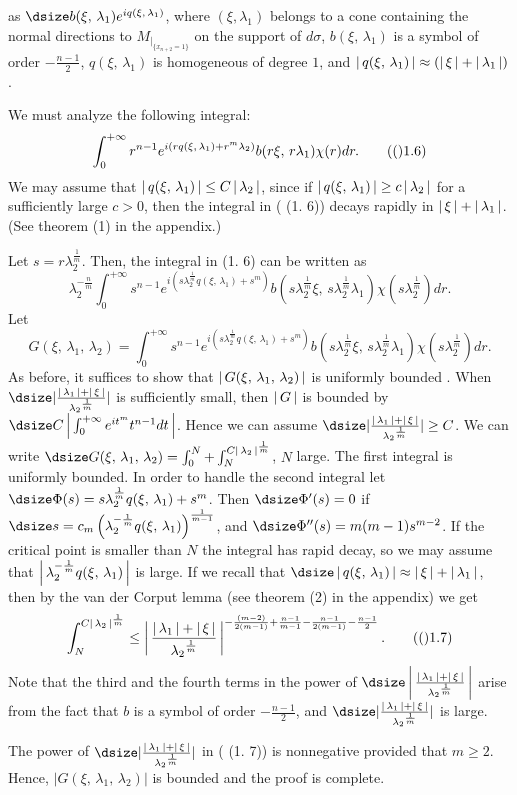 as 
$\dsize  b(\xi,\,\lambda_1)e^{iq(\xi,\,\lambda_1)}$, 
where  $(\xi,\lambda_1) $ belongs to a cone  containing 
the normal directions to $M_{\vert_{\{x_{n+2}=1\}}}$ on the support of 
$d\sigma$, $b(\xi,\,\lambda_1) $
is a symbol of order 
$-\frac{n-1}{2}$, $q(\xi,\,\lambda_1)$ is homogeneous of degree $1$, and 
$\left\vert\,{q(\xi,\,\lambda_1)}\,\right\vert\approx(\left\vert\,{\xi}\,\right\vert+\left\vert\,{\lambda_1}\,\right\vert)$.
\par
We must analyze the following integral:
$$ 
 \int_{0}^{+\infty}r^{n-1}
e^{i( rq(\xi,\,\lambda_1)+r^m\lambda_2)}b(r\xi, \,r\lambda_1)\chi(r)dr .
\tag (1. 6)
$$
We may assume that $\left\vert\,{q(\xi,\,\lambda_1) }\,\right\vert \leq C\left\vert\,{\lambda_2}\,\right\vert$, since if
$\left\vert\,{q(\xi,\,\lambda_1) }\,\right\vert \ge c\left\vert\,{\lambda_2}\,\right\vert$ for a sufficiently large 
$c >0$, then the integral in ( (1. 6)) decays rapidly in 
$\left\vert\,{\xi}\,\right\vert +\left\vert\,{\lambda_1}\,\right\vert $. (See theorem (1) in the appendix.)
\par
Let $s=r\lambda_2^{\frac{1}{m}} $. Then,  the integral in
 (1. 6) can be written as
$$
\lambda_2^{-\frac{n}{m}}\int_{0}^{+\infty}s^{n-1}
e^{i( s\lambda_2^{\frac{1}{m}}q(\xi,\,\lambda_1)+s^m)}
b(s\lambda_2^{\frac{1}{m}}\xi, \,s\lambda_2^{\frac{1}{m}}\lambda_1)
\chi(s\lambda_2^{\frac{1}{m}})dr .
$$
Let 
$$
G(\xi,\,\lambda_1,\,\lambda_2) = 
\int_{0}^{+\infty}s^{n-1}
e^{i( s\lambda_2^{\frac{1}{m}}q(\xi,\,\lambda_1)+s^m)}
b(s\lambda_2^{\frac{1}{m}}\xi, \,s\lambda_2^{\frac{1}{m}}\lambda_1)
\chi(s\lambda_2^{\frac{1}{m}})dr .
$$
As before, it suffices to show that $\left\vert\,{G(\xi,\,\lambda_1,\,\lambda_2)}\,\right\vert$ is 
uniformly bounded . When
 $\dsize \vert\frac{\n{\lambda_1}+\n{\xi}}{{\lambda_2}^{\frac{1}{m}}}\vert $ is sufficiently small, 
then $\left\vert\,{G}\,\right\vert$ is  bounded by $\dsize C\n{\int_{0}^{+\infty}e^{i t^m}t^{n-1} dt}$.
Hence we can assume  $\dsize \vert
\frac{\n{\lambda_1}+\n{\xi}}{{\lambda_2}^{\frac{1}{m}}}\vert \ge C$. We can write 
$\dsize G(\xi,\,\lambda_1,\,\lambda_2) = 
\int_{0}^{N}+\int_{N}^{C\n{\lambda_2}^{\frac{1}{m}}}$, $ N$ large. The first integral 
is uniformly bounded. In order to handle the second integral  let 
$\dsize \Phi(s) = s\lambda_2^{\frac{1}{m}}q(\xi,\,\lambda_1)+s^m$. 
Then $\dsize \Phi'(s) = 0$ if 
$\dsize s = 
c_m\left(\lambda_2^{-\frac{1}{m}}q(\xi,\,\lambda_1)\right)^{\frac{1}{m-1}}$, 
and 
$\dsize \Phi''(s) = m(m-1)s^{m-2}$. If the critical point is smaller than 
$N$ the integral has rapid decay, so we may assume that 
$\left\vert\,{\lambda_2^{-\frac{1}{m}}q(\xi,\,\lambda_1)}\,\right\vert$ is large. 
If we recall that $\dsize 
\n{q(\xi,\,\lambda_1)} \approx \n\xi+\n{\lambda_1}$, then by the van der 
Corput lemma (see theorem (2) in the appendix)  we get 
$$
\int_{N}^{C\n{\lambda_2}^{\frac{1}{m}} }\leq\n{ \frac{\n{\lambda_1}+\n{\xi}}{{\lambda_2}^{\frac{1}{m}}}}^{-\frac{(m-2)}{2(m-1)} +
\frac{n-1}{m-1}-\frac{n-1}{2(m-1)} -\frac{n-1}{2}}.
\tag (1. 7)
$$
Note that the third and the fourth terms in the power of $\dsize \n{\frac{\n{\lambda_1}+\n{\xi}}{{\lambda_2}^{\frac{1}{m}}}}$
arise from the fact that $b$ is a symbol of order $-\frac{n-1}{2}$, and 
$\dsize \vert\frac{\n{\lambda_1}+\n{\xi}}{{\lambda_2}^{\frac{1}{m}}}\vert$ is large.
\par
The power of $\dsize \vert\frac{\n{\lambda_1}+\n{\xi}}{{\lambda_2}^{\frac{1}{m}}}\vert$ in ( (1. 7)) is nonnegative provided that 
$m\ge 2$. Hence, $\vert{ G(\xi,\,\lambda_1,\,\lambda_2)}\vert$ is bounded and the 
proof is complete.
\enddemo
\bigskip

